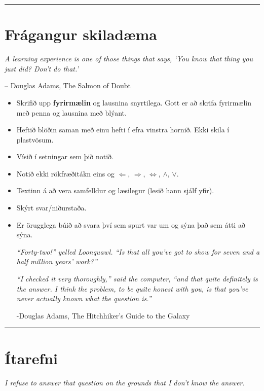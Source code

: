 \documentclass[a4paper,10pt,icelandic]{sphinxmanual}
\begin{document}
\bigskip\hrule{}\bigskip

\newpage

\section{Frágangur skiladæma}
\label{vidauki:fragangur-skiladaema}\label{vidauki:fragangurskiladaema}
\emph{A learning experience is one of those things that says,
`You know that thing you just did? Don't do that.'}

-- Douglas Adams, The Salmon of Doubt
\begin{itemize}
\item {} 
Skrifið upp \textbf{fyrirmælin} og lausnina snyrtilega. Gott er að skrifa fyrirmælin
með penna og lausnina með blýant.

\item {} 
Heftið blöðin saman með einu hefti í efra vinstra hornið. Ekki skila í plastvösum.

\item {} 
Vísið í setningar sem þið notið.

\item {} 
Notið ekki rökfræðitákn eins og \(\Leftarrow\),
\(\Rightarrow\), \(\Leftrightarrow\), \(\wedge\),
\(\vee\).

\item {} 
Textinn á að vera samfelldur og læsilegur (lesið hann sjálf yfir).

\item {} 
Skýrt svar/niðurstaða.

\item {} 
Er örugglega búið að svara því sem spurt var um og sýna það sem átti að sýna.

\emph{“Forty-two!” yelled Loonquawl. “Is that all you’ve got to show for
seven and a half million years’ work?”}

\emph{“I checked it very thoroughly,” said the computer, “and that quite
definitely is the answer. I think the problem, to be quite honest with
you, is that you’ve never actually known what the question is.”}

-Douglas Adams, The Hitchhiker's Guide to the Galaxy

\end{itemize}


\bigskip\hrule{}\bigskip

\newpage

\section{Ítarefni}
\label{vidauki:itarefni}
\emph{I refuse to answer that question on the grounds that I don't know the answer.}
\end{document}
